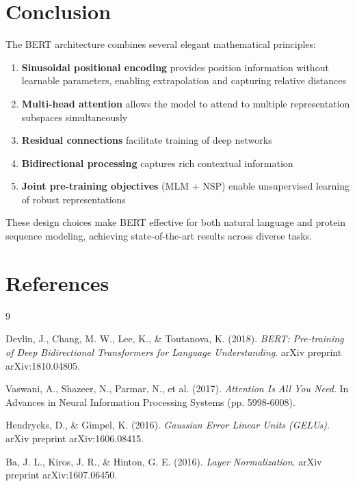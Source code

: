\documentclass[11pt,a4paper]{article}
\begin{document}
\section{Conclusion}

The BERT architecture combines several elegant mathematical principles:

\begin{enumerate}
    \item \textbf{Sinusoidal positional encoding} provides position information without learnable parameters, enabling extrapolation and capturing relative distances
    \item \textbf{Multi-head attention} allows the model to attend to multiple representation subspaces simultaneously
    \item \textbf{Residual connections} facilitate training of deep networks
    \item \textbf{Bidirectional processing} captures rich contextual information
    \item \textbf{Joint pre-training objectives} (MLM + NSP) enable unsupervised learning of robust representations
\end{enumerate}

These design choices make BERT effective for both natural language and protein sequence modeling, achieving state-of-the-art results across diverse tasks.

\section*{References}

\begin{thebibliography}{9}

Devlin, J., Chang, M. W., Lee, K., \& Toutanova, K. (2018).
\textit{BERT: Pre-training of Deep Bidirectional Transformers for Language Understanding}.
arXiv preprint arXiv:1810.04805.

Vaswani, A., Shazeer, N., Parmar, N., et al. (2017).
\textit{Attention Is All You Need}.
In Advances in Neural Information Processing Systems (pp. 5998-6008).

Hendrycks, D., \& Gimpel, K. (2016).
\textit{Gaussian Error Linear Units (GELUs)}.
arXiv preprint arXiv:1606.08415.

Ba, J. L., Kiros, J. R., \& Hinton, G. E. (2016).
\textit{Layer Normalization}.
arXiv preprint arXiv:1607.06450.

\end{thebibliography}
\end{document}
